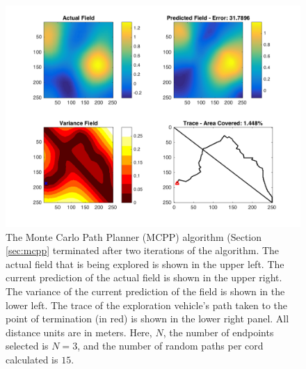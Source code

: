 


\begin{figure}[htb!]
	\centering
	\includegraphics[width=0.95\linewidth]{figures/mc_4panel.png}
	\captionsetup{skip=0.20\baselineskip}
	\ssp
	\caption{The Monte Carlo Path Planner (MCPP) algorithm (Section \ref{sec:mcpp} terminated after two iterations of the algorithm. The actual field that is being explored is shown in the upper left. The current prediction of the actual field is shown in the upper right. The variance of the current prediction of the field is shown in the lower left. The trace of the exploration vehicle's path taken to the point of termination (in red) is shown in the lower right panel. All distance units are in meters. Here, $N$, the number of endpoints selected is $N=3$, and the number of random paths per cord calculated is $15$.}
	\label{fig:mcpp}
\end{figure}

